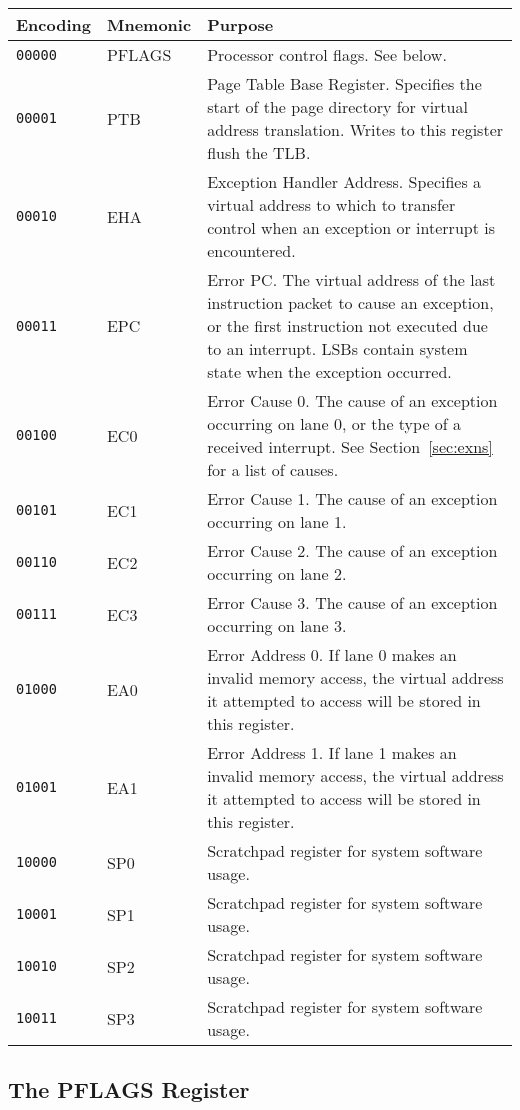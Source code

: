 \documentclass[11pt,openany]{report}
\begin{document}
\begin{table}[!h]
\centering
\begin{tabularx}{\textwidth}{l|l|X}
Encoding & Mnemonic & Purpose\\
\hline
\texttt{00000} & PFLAGS & Processor control flags. See below.\\
\texttt{00001} & PTB & Page Table Base Register. Specifies the start of the page directory for virtual address translation. Writes to this register flush the TLB.\\
\texttt{00010} & EHA & Exception Handler Address. Specifies a virtual address to which to transfer control when an exception or interrupt is encountered.\\
\texttt{00011} & EPC & Error PC. The virtual address of the last instruction packet to cause an exception, or the first instruction not executed due to an interrupt.  LSBs contain system state when the exception occurred. \\
\texttt{00100} & EC0 & Error Cause 0. The cause of an exception occurring on lane 0, or the type of a received interrupt. See Section~\ref{sec:exns} for a list of causes.\\
\texttt{00101} & EC1 & Error Cause 1. The cause of an exception occurring on lane 1.\\
\texttt{00110} & EC2 & Error Cause 2. The cause of an exception occurring on lane 2.\\
\texttt{00111} & EC3 & Error Cause 3. The cause of an exception occurring on lane 3.\\
\texttt{01000} & EA0 & Error Address 0. If lane 0 makes an invalid memory access, the virtual address it attempted to access will be stored in this register.\\
\texttt{01001} & EA1 & Error Address 1. If lane 1 makes an invalid memory access, the virtual address it attempted to access will be stored in this register.\\
\texttt{10000} & SP0 & Scratchpad register for system software usage.\\
\texttt{10001} & SP1 & Scratchpad register for system software usage.\\
\texttt{10010} & SP2 & Scratchpad register for system software usage.\\
\texttt{10011} & SP3 & Scratchpad register for system software usage.
\end{tabularx}
\end{table}

\subsection{The PFLAGS Register}
\end{document}
